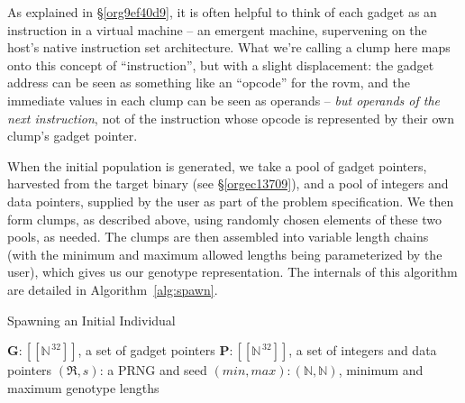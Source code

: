 \documentclass[12pt,glossary]{dalthesis}
\begin{document}
As explained in \S \ref{org9ef40d9}, it is often helpful to think of
each gadget as an instruction in a virtual machine -- an emergent machine,
supervening on the host's native instruction set architecture. What we're
calling a clump here maps onto this concept of ``instruction'', but with a
slight displacement: the gadget address can be seen as something
like an ``opcode'' for the \gls{rovm}, and the immediate values in each clump
can be seen as operands -- \emph{but operands of the next instruction}, not of
the instruction whose opcode is represented by their own clump's gadget
pointer.

When the initial population is generated, we take a pool of gadget pointers, 
harvested from the target binary (see \S \ref{orgec13709}), and a
pool of integers and data pointers, supplied by the user as part of the problem
specification. We then form clumps, as described above, using randomly chosen
elements of these two pools, as needed. The clumps are then assembled into 
variable length chains (with the minimum and maximum allowed lengths being
parameterized by the user), which gives us our genotype representation. The
internals of this algorithm are detailed in Algorithm~\ref{alg:spawn}.

\begin{algorithm}
\caption{Spawning an Initial Individual}
\label{alg:spawn}
\begin{algorithmic}[1]
\REQUIRE $\mathbf{G}: [\![\mathbb{N}^{\,32}]\!]$, a set of gadget pointers
\REQUIRE $\mathbf{P}: [\![\mathbb{N}^{\,32}]\!]$, a set of integers and data pointers
\REQUIRE $(\mathfrak{R}, s)$: a PRNG and seed
\REQUIRE $(min, max): (\mathbb{N}, \mathbb{N})$, minimum and maximum genotype lengths
 
    \ENDFOR
\ENDFOR
\RETURN {$\Gamma$}
\end{algorithmic}
\end{algorithm}
\end{document}
